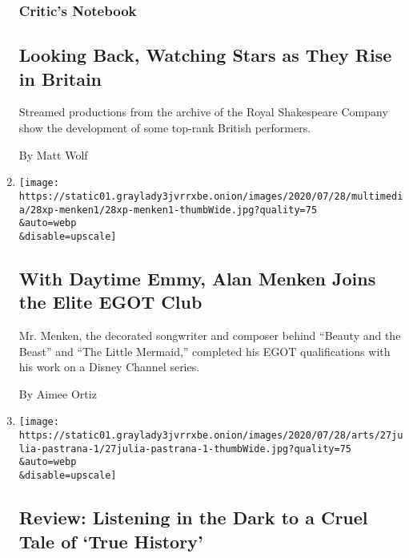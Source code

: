 \begin{enumerate}
  \hypertarget{critics-notebook-1}{%
  \subsubsection{Critic's Notebook}\label{critics-notebook-1}}

  \hypertarget{looking-back-watching-stars-as-they-rise-in-britain}{%
  \subsection{Looking Back, Watching Stars as They Rise in
  Britain}\label{looking-back-watching-stars-as-they-rise-in-britain}}

  Streamed productions from the archive of the Royal Shakespeare Company
  show the development of some top-rank British performers.

  By Matt Wolf
\item
  \href{/2020/07/28/arts/alan-menken-egot.html}{}

  \texttt{[image: https://static01.graylady3jvrrxbe.onion/images/2020/07/28/multimedia/28xp-menken1/28xp-menken1-thumbWide.jpg?quality=75\\\&auto=webp\\\&disable=upscale]}

  \hypertarget{with-daytime-emmy-alan-menken-joins-the-elite-egot-club}{%
  \subsection{With Daytime Emmy, Alan Menken Joins the Elite EGOT
  Club}\label{with-daytime-emmy-alan-menken-joins-the-elite-egot-club}}

  Mr. Menken, the decorated songwriter and composer behind ``Beauty and
  the Beast'' and ``The Little Mermaid,'' completed his EGOT
  qualifications with his work on a Disney Channel series.

  By Aimee Ortiz
\item
  \href{/2020/07/27/theater/true-history-julia-pastrana-review.html}{}

  \texttt{[image: https://static01.graylady3jvrrxbe.onion/images/2020/07/28/arts/27julia-pastrana-1/27julia-pastrana-1-thumbWide.jpg?quality=75\\\&auto=webp\\\&disable=upscale]}

  \hypertarget{review-listening-in-the-dark-to-a-cruel-tale-of-true-history}{%
  \subsection{Review: Listening in the Dark to a Cruel Tale of `True
  History'}\label{review-listening-in-the-dark-to-a-cruel-tale-of-true-history}}


\end{enumerate}
